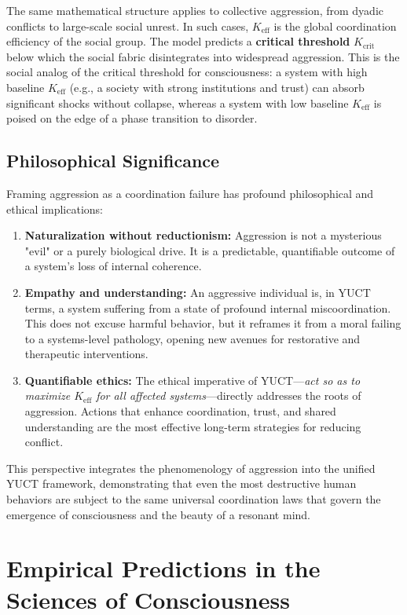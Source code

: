 \documentclass[12pt,a4paper]{article}
\begin{document}
	The same mathematical structure applies to collective aggression, from dyadic conflicts to large-scale social unrest. In such cases, \(K_{\mathrm{eff}}\) is the global coordination efficiency of the social group. The model predicts a \textbf{critical threshold} \(K_{\mathrm{crit}}\) below which the social fabric disintegrates into widespread aggression. This is the social analog of the critical threshold for consciousness: a system with high baseline \(K_{\mathrm{eff}}\) (e.g., a society with strong institutions and trust) can absorb significant shocks without collapse, whereas a system with low baseline \(K_{\mathrm{eff}}\) is poised on the edge of a phase transition to disorder.
	
	\subsection{Philosophical Significance}
	
	Framing aggression as a coordination failure has profound philosophical and ethical implications:
	
	\begin{enumerate}
		\item \textbf{Naturalization without reductionism:} Aggression is not a mysterious "evil" or a purely biological drive. It is a predictable, quantifiable outcome of a system's loss of internal coherence.
		\item \textbf{Empathy and understanding:} An aggressive individual is, in YUCT terms, a system suffering from a state of profound internal miscoordination. This does not excuse harmful behavior, but it reframes it from a moral failing to a systems-level pathology, opening new avenues for restorative and therapeutic interventions.
		\item \textbf{Quantifiable ethics:} The ethical imperative of YUCT—\textit{act so as to maximize \(K_{\mathrm{eff}}\) for all affected systems}—directly addresses the roots of aggression. Actions that enhance coordination, trust, and shared understanding are the most effective long-term strategies for reducing conflict.
	\end{enumerate}
	
	This perspective integrates the phenomenology of aggression into the unified YUCT framework, demonstrating that even the most destructive human behaviors are subject to the same universal coordination laws that govern the emergence of consciousness and the beauty of a resonant mind.
	
	\section{Empirical Predictions in the Sciences of Consciousness}
	
\end{document}
